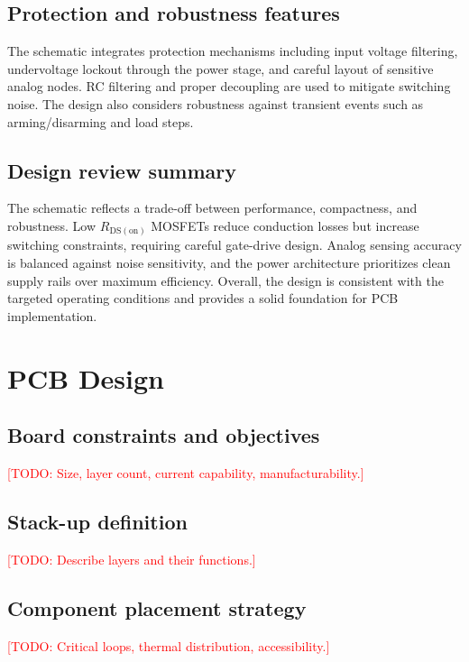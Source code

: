 \documentclass[11pt,a4paper]{article}
\newcommand{\todo}[1]{\textcolor{red}{[TODO: #1]}}
\begin{document}
\subsection{Protection and robustness features}

The schematic integrates protection mechanisms including input voltage filtering, undervoltage lockout through the power stage, and careful layout of sensitive analog nodes. RC filtering and proper decoupling are used to mitigate switching noise. The design also considers robustness against transient events such as arming/disarming and load steps.

\subsection{Design review summary}

The schematic reflects a trade-off between performance, compactness, and robustness. Low $R_{\mathrm{DS(on)}}$ MOSFETs reduce conduction losses but increase switching constraints, requiring careful gate-drive design. Analog sensing accuracy is balanced against noise sensitivity, and the power architecture prioritizes clean supply rails over maximum efficiency. Overall, the design is consistent with the targeted operating conditions and provides a solid foundation for PCB implementation.

\section{PCB Design}
\label{sec:pcb}

\subsection{Board constraints and objectives}
\todo{Size, layer count, current capability, manufacturability.}

\subsection{Stack-up definition}
\todo{Describe layers and their functions.}

\subsection{Component placement strategy}
\todo{Critical loops, thermal distribution, accessibility.}
\end{document}
